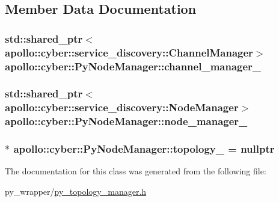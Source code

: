 \subsection{Member Data Documentation}
\hypertarget{classapollo_1_1cyber_1_1PyNodeManager_a45882a06e6b80f7f5125aba07c7d61ca}{
\subsubsection[{channel\-\_\-manager\-\_\-}]{\setlength{\rightskip}{0pt plus 5cm}std\-::shared\-\_\-ptr$<${\bf apollo\-::cyber\-::service\-\_\-discovery\-::\-Channel\-Manager}$>$ apollo\-::cyber\-::\-Py\-Node\-Manager\-::channel\-\_\-manager\-\_\-\hspace{0.3cm}{\ttfamily [private]}}}\label{classapollo_1_1cyber_1_1PyNodeManager_a45882a06e6b80f7f5125aba07c7d61ca}
\hypertarget{classapollo_1_1cyber_1_1PyNodeManager_a57c79a8bbc1471e37a605558acd8e949}{
\subsubsection[{node\-\_\-manager\-\_\-}]{\setlength{\rightskip}{0pt plus 5cm}std\-::shared\-\_\-ptr$<${\bf apollo\-::cyber\-::service\-\_\-discovery\-::\-Node\-Manager}$>$ apollo\-::cyber\-::\-Py\-Node\-Manager\-::node\-\_\-manager\-\_\-\hspace{0.3cm}{\ttfamily [private]}}}\label{classapollo_1_1cyber_1_1PyNodeManager_a57c79a8bbc1471e37a605558acd8e949}
\hypertarget{classapollo_1_1cyber_1_1PyNodeManager_ab72b315e5e7a19954bbd5f4e27a347d6}{
\subsubsection[{topology\-\_\-}]{$\ast$ apollo\-::cyber\-::\-Py\-Node\-Manager\-::topology\-\_\- = nullptr\hspace{0.3cm}{\ttfamily [private]}}}\label{classapollo_1_1cyber_1_1PyNodeManager_ab72b315e5e7a19954bbd5f4e27a347d6}


The documentation for this class was generated from the following file\-:\begin{DoxyCompactItemize}
\item 
py\-\_\-wrapper/\hyperlink{py__topology__manager_8h}{py\-\_\-topology\-\_\-manager.\-h}\end{DoxyCompactItemize}
